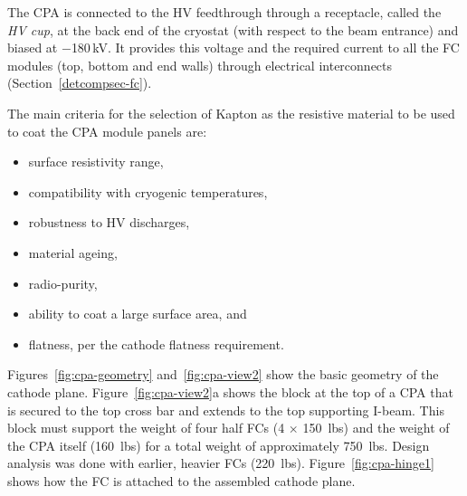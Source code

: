 The CPA is connected to the HV feedthrough through a receptacle, called the \textit{HV cup}, at the back end of the cryostat (with respect to the beam entrance) and biased at $-$180\,kV.   It provides this voltage and the required current to all the FC modules (top, bottom and end walls) through electrical interconnects (Section~\ref{detcompsec-fc}). 




The main criteria for the selection of Kapton as the resistive material to be used to coat the CPA module panels are: %
\begin{itemize}
\item surface resistivity range,
\item compatibility with cryogenic temperatures,
\item robustness to HV discharges, 
\item material ageing,
\item radio-purity,
\item ability to coat a large surface area, and %
\item flatness, per the cathode flatness requirement. 
\end{itemize}


Figures~\ref{fig:cpa-geometry} and~\ref{fig:cpa-view2} show the basic geometry of the cathode plane. Figure~\ref{fig:cpa-view2}a shows the block at the top of a CPA that is secured to the top cross bar and extends to the top supporting I-beam.  This block must support the weight of four half FCs (4 $\times$ 150~lbs) and the weight of the CPA itself (160~lbs) for a total weight of approximately 750~lbs.  Design analysis was done with earlier, heavier FCs (220~lbs). Figure~\ref{fig:cpa-hinge1} shows how the FC is attached to the assembled cathode plane. 

